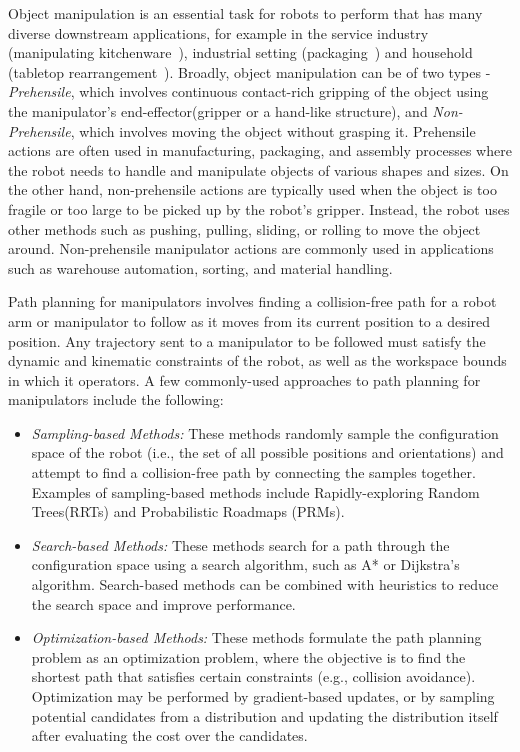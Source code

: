 Object manipulation is an essential task for robots to perform that has many diverse downstream applications, for example in the service industry (manipulating kitchenware~\cite{kitchen_arm}), industrial setting (packaging~\cite{industrial_arm}) and household (tabletop rearrangement~\cite{agarwal2022approaches}). Broadly, object manipulation can be of two types - \textit{Prehensile}, which involves continuous contact-rich gripping of the object using the manipulator's end-effector(gripper or a hand-like structure), and \textit{Non-Prehensile}, which involves moving the object without grasping it. Prehensile actions are often used in manufacturing, packaging, and assembly processes where the robot needs to handle and manipulate objects of various shapes and sizes. On the other hand, non-prehensile actions are typically used when the object is too fragile or too large to be picked up by the robot's gripper. Instead, the robot uses other methods such as pushing, pulling, sliding, or rolling to move the object around. Non-prehensile manipulator actions are commonly used in applications such as warehouse automation, sorting, and material handling.

Path planning for manipulators involves finding a collision-free path for a robot arm or manipulator to follow as it moves from its current position to a desired position. Any trajectory sent to a manipulator to be followed must satisfy the dynamic and kinematic constraints of the robot, as well as the workspace bounds in which it operators. A few commonly-used approaches to path planning for manipulators include the following:

\begin{itemize}
    \item \textit{Sampling-based Methods:} These methods randomly sample the configuration space of the robot (i.e., the set of all possible positions and orientations) and attempt to find a collision-free path by connecting the samples together. Examples of sampling-based methods include Rapidly-exploring Random Trees(RRTs)\cite{RRT-og} and Probabilistic Roadmaps (PRMs)\cite{PRM}.
    \item \textit{Search-based Methods:} These methods search for a path through the configuration space using a search algorithm, such as A*\cite{A*} or Dijkstra's algorithm. Search-based methods can be combined with heuristics to reduce the search space and improve performance.
    \item \textit{Optimization-based Methods:} These methods formulate the path planning problem as an optimization problem, where the objective is to find the shortest path that satisfies certain constraints (e.g., collision avoidance). Optimization may be performed by gradient-based updates, or by sampling potential candidates from a distribution and updating the distribution itself after evaluating the cost over the candidates. 

\end{itemize}


